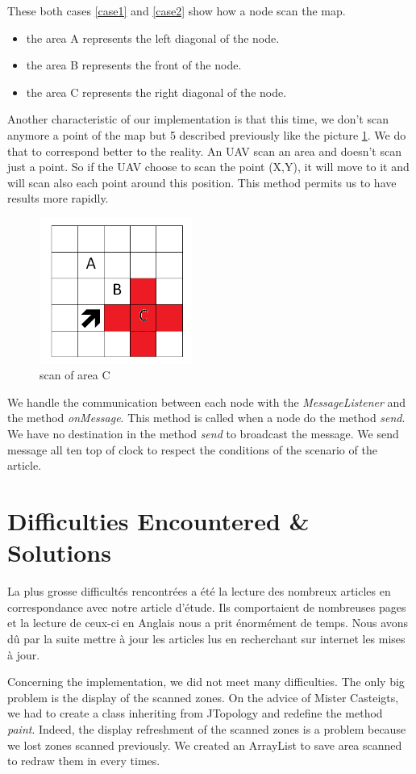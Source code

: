 These both cases \ref{case1} and \ref{case2} show how a node scan the map.

\begin{itemize}
\item the area A represents the left diagonal of the node.
\item the area B represents the front of the node.
\item the area C represents the right diagonal of the node.
\end{itemize}

Another characteristic of our implementation is that this time, we don't scan anymore a point of the map but 5 described previously  like the picture \ref{scanofarea}. We do that to correspond better to the reality. An UAV scan an area and doesn't scan just a point. So if the UAV choose to scan the point (X,Y), it will move to it and will scan also each point around this position. This method permits us to have results more rapidly.

\begin{figure}[!h]
\center
\includegraphics[width=5cm]{../images/grille_case_2_scan.png}
\caption{\label{scanofarea}scan of area C}
\end{figure}

We handle the communication between each node with the \textit{MessageListener} and the method \textit{onMessage}. This method is called when a node do the method \textit{send}. We have no destination in the method \textit{send} to broadcast the message. We send message all ten top of clock to respect the conditions of the scenario of the article.

\section{Difficulties Encountered \& Solutions}

La plus grosse difficultés rencontrées a été la lecture des nombreux articles en correspondance avec notre article d'étude. Ils comportaient de nombreuses pages et la lecture de ceux-ci en Anglais nous a prit énormément de temps. Nous avons dû par la suite mettre à jour les articles lus en recherchant sur internet les mises à jour.

Concerning the implementation, we did not meet many difficulties. The only big problem is the display of the scanned zones. On the advice of Mister Casteigts, we had to create a class inheriting from JTopology and redefine the method \textit{paint}. Indeed, the display refreshment of the scanned zones is a problem because we lost zones scanned previously. We created an ArrayList to save area scanned to redraw them in every times.
